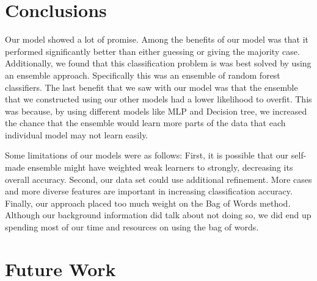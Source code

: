 \documentclass{article}
\begin{document}
\section{Conclusions}

Our model showed a lot of promise. Among the benefits of our model was that it performed significantly better than either guessing or giving the majority case. Additionally, we found that this classification problem is was best solved by using an ensemble approach. Specifically this was an ensemble of random forest classifiers. The last benefit that we saw with our model was that the ensemble that we constructed using our other models had a lower likelihood to overfit. This was because, by using different models like MLP and Decision tree, we increased the chance that the ensemble would learn more parts of the data that each individual model may not learn easily.\par
Some limitations of our models were as follows: First, it is possible that our self-made ensemble might have weighted weak learners to strongly, decreasing its overall accuracy. Second, our data set could use additional refinement. More cases and more diverse features are important in increasing classification accuracy. Finally, our approach placed too much weight on the Bag of Words method. Although our background information did talk about not doing so, we did end up spending most of our time and resources on using the bag of words.

\section{Future Work}
\end{document}
